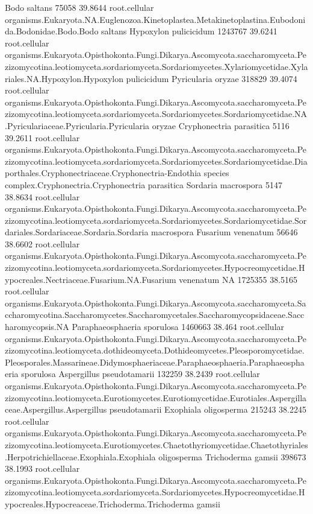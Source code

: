\documentclass{article}
\begin{document}
\begin{Schunk}
\begin{Soutput}
 Bodo saltans 		 75058 39.8644 	 root.cellular organisms.Eukaryota.NA.Euglenozoa.Kinetoplastea.Metakinetoplastina.Eubodonida.Bodonidae.Bodo.Bodo saltans
 Hypoxylon pulicicidum 		 1243767 39.6241 	 root.cellular organisms.Eukaryota.Opisthokonta.Fungi.Dikarya.Ascomycota.saccharomyceta.Pezizomycotina.leotiomyceta.sordariomyceta.Sordariomycetes.Xylariomycetidae.Xylariales.NA.Hypoxylon.Hypoxylon pulicicidum
 Pyricularia oryzae 		 318829 39.4074 	 root.cellular organisms.Eukaryota.Opisthokonta.Fungi.Dikarya.Ascomycota.saccharomyceta.Pezizomycotina.leotiomyceta.sordariomyceta.Sordariomycetes.Sordariomycetidae.NA.Pyriculariaceae.Pyricularia.Pyricularia oryzae
 Cryphonectria parasitica 		 5116 39.2611 	 root.cellular organisms.Eukaryota.Opisthokonta.Fungi.Dikarya.Ascomycota.saccharomyceta.Pezizomycotina.leotiomyceta.sordariomyceta.Sordariomycetes.Sordariomycetidae.Diaporthales.Cryphonectriaceae.Cryphonectria-Endothia species complex.Cryphonectria.Cryphonectria parasitica
 Sordaria macrospora 		 5147 38.8634 	 root.cellular organisms.Eukaryota.Opisthokonta.Fungi.Dikarya.Ascomycota.saccharomyceta.Pezizomycotina.leotiomyceta.sordariomyceta.Sordariomycetes.Sordariomycetidae.Sordariales.Sordariaceae.Sordaria.Sordaria macrospora
 Fusarium venenatum 		 56646 38.6602 	 root.cellular organisms.Eukaryota.Opisthokonta.Fungi.Dikarya.Ascomycota.saccharomyceta.Pezizomycotina.leotiomyceta.sordariomyceta.Sordariomycetes.Hypocreomycetidae.Hypocreales.Nectriaceae.Fusarium.NA.Fusarium venenatum
 NA 		 1725355 38.5165 	 root.cellular organisms.Eukaryota.Opisthokonta.Fungi.Dikarya.Ascomycota.saccharomyceta.Saccharomycotina.Saccharomycetes.Saccharomycetales.Saccharomycopsidaceae.Saccharomycopsis.NA
 Paraphaeosphaeria sporulosa 		 1460663 38.464 	 root.cellular organisms.Eukaryota.Opisthokonta.Fungi.Dikarya.Ascomycota.saccharomyceta.Pezizomycotina.leotiomyceta.dothideomyceta.Dothideomycetes.Pleosporomycetidae.Pleosporales.Massarineae.Didymosphaeriaceae.Paraphaeosphaeria.Paraphaeosphaeria sporulosa
 Aspergillus pseudotamarii 		 132259 38.2439 	 root.cellular organisms.Eukaryota.Opisthokonta.Fungi.Dikarya.Ascomycota.saccharomyceta.Pezizomycotina.leotiomyceta.Eurotiomycetes.Eurotiomycetidae.Eurotiales.Aspergillaceae.Aspergillus.Aspergillus pseudotamarii
 Exophiala oligosperma 		 215243 38.2245 	 root.cellular organisms.Eukaryota.Opisthokonta.Fungi.Dikarya.Ascomycota.saccharomyceta.Pezizomycotina.leotiomyceta.Eurotiomycetes.Chaetothyriomycetidae.Chaetothyriales.Herpotrichiellaceae.Exophiala.Exophiala oligosperma
 Trichoderma gamsii 		 398673 38.1993 	 root.cellular organisms.Eukaryota.Opisthokonta.Fungi.Dikarya.Ascomycota.saccharomyceta.Pezizomycotina.leotiomyceta.sordariomyceta.Sordariomycetes.Hypocreomycetidae.Hypocreales.Hypocreaceae.Trichoderma.Trichoderma gamsii

\end{Soutput}
\end{Schunk}
\end{document}
